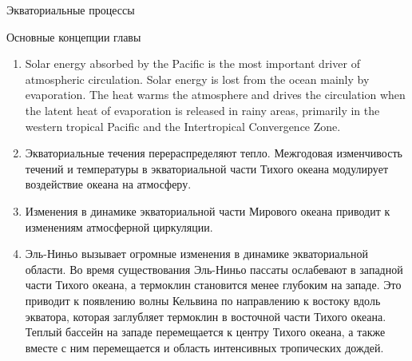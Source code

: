 \begin{chapter}{Экваториальные процессы}
\begin{section}{Основные концепции главы}
\begin{enumerate}
\item
Solar energy absorbed by the Pacific is the most important driver of
atmospheric circulation. Solar energy is lost from the ocean mainly by
evaporation. The heat warms the atmosphere and drives the circulation
when the latent heat of evaporation is released in rainy areas,
primarily in the western tropical Pacific and the Intertropical
Convergence Zone.
%

\item
Экваториальные течения перераспределяют тепло. Межгодовая изменчивость
течений и температуры в экваториальной части Тихого океана модулирует
воздействие океана на атмосферу.
%

\item
Изменения в динамике экваториальной части Мирового океана приводит к
изменениям атмосферной циркуляции.
%

\item
Эль-Ниньо вызывает огромные изменения в динамике экваториальной
области. Во время существования Эль-Ниньо пассаты ослабевают в
западной части Тихого океана, а термоклин становится менее глубоким на
западе. Это приводит к появлению волны Кельвина по направлению к
востоку вдоль экватора, которая заглубляет термоклин в восточной части
Тихого океана. Теплый бассейн на западе перемещается к центру Тихого
океана, а также вместе с ним перемещается и область интенсивных
тропических дождей.
%


\end{enumerate}
\end{section}
\end{chapter}
